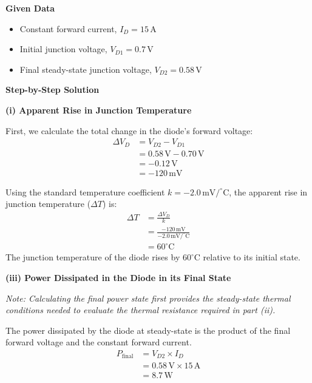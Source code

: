 \documentclass[12pt,a3paper]{article}
\begin{document}
\begin{enumerate}
\begin{tcolorbox}[enhanced,breakable,ansbox,colback=cA!4,colframe=cA,boxrule=0.8pt,arc=5pt,title={\textbf{Answer}},fonttitle=\bfseries\color{white},colbacktitle=cA]
\vspace{0.5cm}

\textbf{Given Data}
\begin{itemize}
    \item Constant forward current, $I_D = 15 \, \text{A}$
    \item Initial junction voltage, $V_{D1} = 0.7 \, \text{V}$
    \item Final steady-state junction voltage, $V_{D2} = 0.58 \, \text{V}$
\end{itemize}

\vspace{0.5cm}

\textbf{Step-by-Step Solution}

\textbf{(i) Apparent Rise in Junction Temperature}

First, we calculate the total change in the diode's forward voltage:
\begin{align*}
    \Delta V_D &= V_{D2} - V_{D1} \\
    &= 0.58 \, \text{V} - 0.70 \, \text{V} \\
    &= -0.12 \, \text{V} \\
    &= -120 \, \text{mV}
\end{align*}

Using the standard temperature coefficient $k = -2.0 \, \text{mV}/^\circ\text{C}$, the apparent rise in junction temperature ($\Delta T$) is:
\begin{align}
    \Delta T &= \frac{\Delta V_D}{k} \nonumber \\
    &= \frac{-120 \, \text{mV}}{-2.0 \, \text{mV}/^\circ\text{C}} \nonumber \\
    &= 60^\circ\text{C}
\end{align}
The junction temperature of the diode rises by $60^\circ\text{C}$ relative to its initial state.

\vspace{0.5cm}

\textbf{(iii) Power Dissipated in the Diode in its Final State}

\textit{Note: Calculating the final power state first provides the steady-state thermal conditions needed to evaluate the thermal resistance required in part (ii).}

The power dissipated by the diode at steady-state is the product of the final forward voltage and the constant forward current.
\begin{align}
    P_{\text{final}} &= V_{D2} \times I_D \nonumber \\
    &= 0.58 \, \text{V} \times 15 \, \text{A} \nonumber \\
    &= 8.7 \, \text{W}
\end{align}


\end{tcolorbox}
\end{enumerate}
\end{document}
